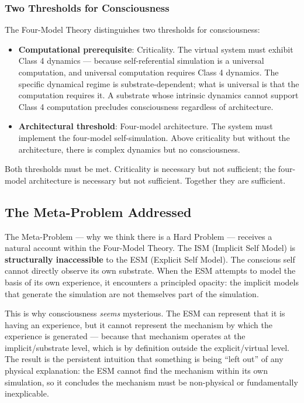 \documentclass[12pt]{article}
\begin{document}
\subsubsection{Two Thresholds for Consciousness}

The Four-Model Theory distinguishes two thresholds for consciousness:
\begin{itemize}
\item \textbf{Computational prerequisite}: Criticality. The virtual system must exhibit Class 4 dynamics --- because self-referential simulation is a universal computation, and universal computation requires Class 4 dynamics. The specific dynamical regime is substrate-dependent; what is universal is that the computation requires it. A substrate whose intrinsic dynamics cannot support Class 4 computation precludes consciousness regardless of architecture.
\item \textbf{Architectural threshold}: Four-model architecture. The system must implement the four-model self-simulation. Above criticality but without the architecture, there is complex dynamics but no consciousness.
\end{itemize}

Both thresholds must be met. Criticality is necessary but not sufficient; the four-model architecture is necessary but not sufficient. Together they are sufficient.


\subsection{The Meta-Problem Addressed}


The Meta-Problem --- why we think there is a Hard Problem --- receives a natural account within the Four-Model Theory. The ISM (Implicit Self Model) is \textbf{structurally inaccessible} to the ESM (Explicit Self Model). The conscious self cannot directly observe its own substrate. When the ESM attempts to model the basis of its own experience, it encounters a principled opacity: the implicit models that generate the simulation are not themselves part of the simulation.

This is why consciousness \emph{seems} mysterious. The ESM can represent that it is having an experience, but it cannot represent the mechanism by which the experience is generated --- because that mechanism operates at the implicit/substrate level, which is by definition outside the explicit/virtual level. The result is the persistent intuition that something is being ``left out'' of any physical explanation: the ESM cannot find the mechanism within its own simulation, so it concludes the mechanism must be non-physical or fundamentally inexplicable.
\end{document}

